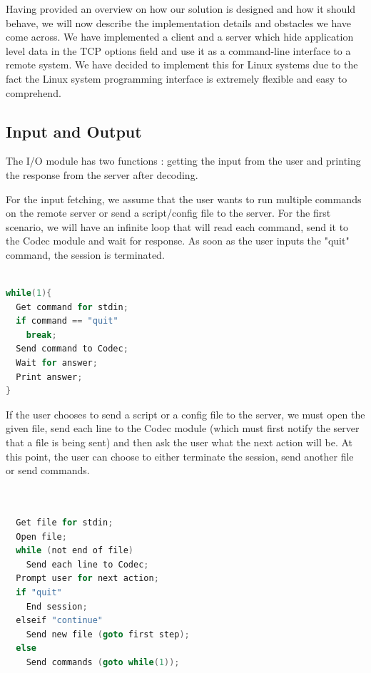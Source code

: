 Having provided an overview on how our solution is designed and how it should
behave, we will now describe the implementation details and obstacles we have
come across. We have implemented a client and a server which hide application
level data in the TCP options field and use it as a command-line interface to
a remote system. We have decided to implement this for Linux systems due to
the fact the Linux system programming interface is extremely flexible and easy
to comprehend.

\subsection{Input and Output}


The I/O module has two functions : getting the input from the user and printing
the response from the server after decoding.

For the input fetching, we assume that the user wants to run multiple commands
on the remote server or send a script/config file to the server. For the first
scenario, we will have an infinite loop that will read each command, send it to 
the Codec module and wait for response. As soon as the user inputs the "quit"
command, the session is terminated.

\begin{lstlisting}[caption={Basic command processing},
                   label={lst:our-tcphdr},
                   basicstyle=\footnotesize,
                   captionpos=b,
                   frame=single,
                   language=C
                  ]

while(1){
  Get command for stdin;
  if command == "quit"
    break;
  Send command to Codec;
  Wait for answer;
  Print answer;
}
\end{lstlisting}

If the user chooses to send a script or a config file to the server, we must open
the given file, send each line to the Codec module (which must first notify the server 
that a file is being sent) and then ask the user what the next action will be. At this
point, the user can choose to either terminate the session, send another file or send 
commands. 

\begin{lstlisting}[caption={File processing},
                   label={lst:our-tcphdr},
                   basicstyle=\footnotesize,
                   captionpos=b,
                   frame=single,
                   language=C
                  ]


  Get file for stdin;
  Open file;
  while (not end of file)
    Send each line to Codec;
  Prompt user for next action;
  if "quit"
    End session;
  elseif "continue"
    Send new file (goto first step);
  else
    Send commands (goto while(1));

\end{lstlisting}

